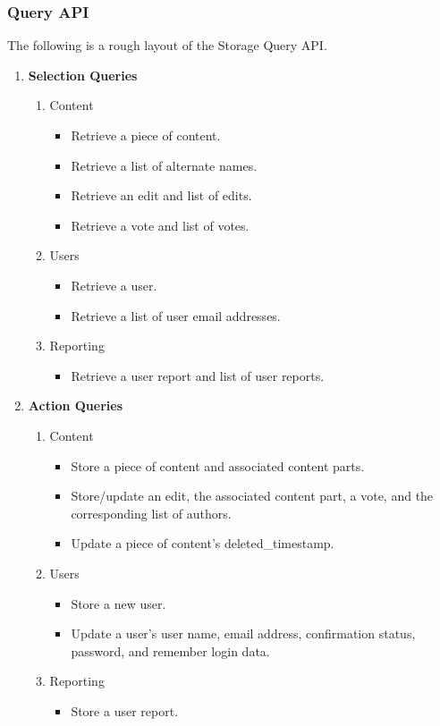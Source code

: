 \documentclass[12pt,letterpaper]{article}
\begin{document}
\subsubsection{Query API}
The following is a rough layout of the Storage Query API. 
\begin{enumerate}
\item[] \begin{center} \textbf{Selection Queries} \end{center}
\begin{enumerate}
\item[] Content
\begin{itemize}
\item Retrieve a piece of content.
\item Retrieve a list of alternate names.
\item Retrieve an edit and list of edits.
\item Retrieve a vote and list of votes.
\end{itemize}
\item[] Users
\begin{itemize}
\item Retrieve a user.
\item Retrieve a list of user email addresses.
\end{itemize}
\item[] Reporting
\begin{itemize}
\item Retrieve a user report and list of user reports.
\end{itemize}
\end{enumerate}
\item[] \begin{center} \textbf{Action Queries} \end{center}
\begin{enumerate}
\item[] Content
\begin{itemize}
\item Store a piece of content and associated content parts.
\item Store/update an edit, the associated content part, a vote, and the corresponding list of authors. 
\item Update a piece of content's deleted\_timestamp.
\end{itemize}
\item[] Users
\begin{itemize}
\item Store a new user.
\item Update a user's user name, email address, confirmation status, password, and remember login data.
\end{itemize}
\item[] Reporting
\begin{itemize}
\item Store a user report.
\end{itemize}
\end{enumerate}
\end{enumerate}
\end{document}
